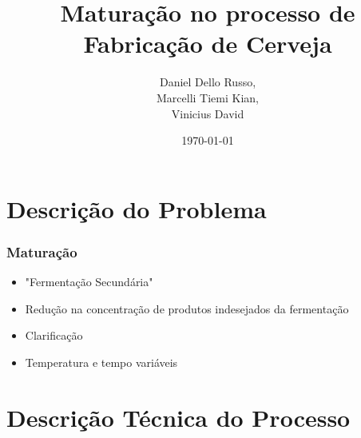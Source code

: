 \documentclass{beamer}
\title[Projeto Final]{Maturação no processo de Fabricação de Cerveja} %
\author{Daniel Dello Russo,\\ Marcelli Tiemi Kian,\\ Vinicius David} %
\institute[FEM] %
{
Universidade Estadual de Campinas \\ %
\medskip
\textit{} %
}
\date{\today} %
\begin{document}
\begin{frame}
\titlepage %
\end{frame}

\begin{frame}

\tableofcontents %
\end{frame}

\section{Descrição do Problema}
\begin{frame}
	\frametitle{Maturação}
	\begin{itemize}
		\item "Fermentação Secundária"
		\item Redução na concentração de produtos indesejados da fermentação
		\item Clarificação
		\item Temperatura e tempo variáveis
	\end{itemize}
\end{frame}
\section{Descrição Técnica do Processo} 
\end{document}
